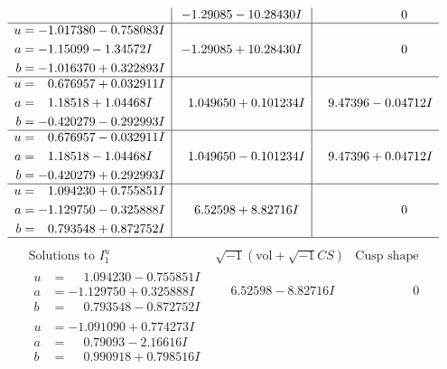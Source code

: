\documentclass[1p]{elsarticle_modified}
\theoremstyle{definition}
\newcommand{\I}{\sqrt{-1}}
\begin{document}
$$\begin{array}{c|c|c}
 & -1.29085 - 10.28430 I & \phantom{-0.000000 } 0 \\ \hline\begin{aligned}
u &= -1.017380 - 0.758083 I \\
a &= -1.15099 - 1.34572 I \\
b &= -1.016370 + 0.322893 I\end{aligned}
 & -1.29085 + 10.28430 I & \phantom{-0.000000 } 0 \\ \hline\begin{aligned}
u &= \phantom{-}0.676957 + 0.032911 I \\
a &= \phantom{-}1.18518 + 1.04468 I \\
b &= -0.420279 - 0.292993 I\end{aligned}
 & \phantom{-}1.049650 + 0.101234 I & \phantom{-}9.47396 - 0.04712 I \\ \hline\begin{aligned}
u &= \phantom{-}0.676957 - 0.032911 I \\
a &= \phantom{-}1.18518 - 1.04468 I \\
b &= -0.420279 + 0.292993 I\end{aligned}
 & \phantom{-}1.049650 - 0.101234 I & \phantom{-}9.47396 + 0.04712 I \\ \hline\begin{aligned}
u &= \phantom{-}1.094230 + 0.755851 I \\
a &= -1.129750 - 0.325888 I \\
b &= \phantom{-}0.793548 + 0.872752 I\end{aligned}
 & \phantom{-}6.52598 + 8.82716 I & \phantom{-0.000000 } 0\\
 \hline 
 \end{array}$$\newpage$$\begin{array}{c|c|c}  
\text{Solutions to }I^u_{1}& \I (\text{vol} + \sqrt{-1}CS) & \text{Cusp shape}\\
 \hline 
\begin{aligned}
u &= \phantom{-}1.094230 - 0.755851 I \\
a &= -1.129750 + 0.325888 I \\
b &= \phantom{-}0.793548 - 0.872752 I\end{aligned}
 & \phantom{-}6.52598 - 8.82716 I & \phantom{-0.000000 } 0 \\ \hline\begin{aligned}
u &= -1.091090 + 0.774273 I \\
a &= \phantom{-}0.79093 - 2.16616 I \\
b &= \phantom{-}0.990918 + 0.798516 I\end{aligned}

\end{array}$$
\end{document}
